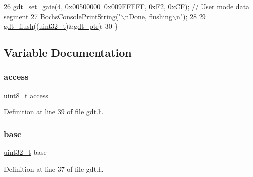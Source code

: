 \begin{DoxyCode}
26     \hyperlink{a00065_abcf0775ea602ace125ae809475b6d8bf_abcf0775ea602ace125ae809475b6d8bf}{gdt\_set\_gate}(4, 0x00500000, 0x009FFFFF, 0xF2, 0xCF); \textcolor{comment}{// User mode data segment}
27     \hyperlink{a00047_a19e1f554d03c977f8b947f21489daa41_a19e1f554d03c977f8b947f21489daa41}{BochsConsolePrintString}(\textcolor{stringliteral}{"\(\backslash\)nDone, flushing\(\backslash\)n"});
28 
29     \hyperlink{a00068_a62397fecbde23244b570ae632fe926fa_a62397fecbde23244b570ae632fe926fa}{gdt\_flush}((\hyperlink{a00101_a435d1572bf3f880d55459d9805097f62_a435d1572bf3f880d55459d9805097f62}{uint32\_t})&\hyperlink{a00068_ab0888c07dfb9352ef76d05e63464cf0b_ab0888c07dfb9352ef76d05e63464cf0b}{gdt\_ptr});
30 \}
\end{DoxyCode}


\subsection{Variable Documentation}
\mbox{\label{a00068_a8b0d6200bc639dd37ff68847a0adde5f_a8b0d6200bc639dd37ff68847a0adde5f}} 
\subsubsection{\texorpdfstring{access}{access}}
{\footnotesize\ttfamily \hyperlink{a00101_aba7bc1797add20fe3efdf37ced1182c5_aba7bc1797add20fe3efdf37ced1182c5}{uint8\+\_\+t} access}



Definition at line 39 of file gdt.\+h.

\mbox{\label{a00068_a0523cedff47e2441fc198b7770ec5d3f_a0523cedff47e2441fc198b7770ec5d3f}} 
\subsubsection{\texorpdfstring{base}{base}}
{\footnotesize\ttfamily \hyperlink{a00101_a435d1572bf3f880d55459d9805097f62_a435d1572bf3f880d55459d9805097f62}{uint32\+\_\+t} base}



Definition at line 37 of file gdt.\+h.

\mbox{\label{a00068_a1a173457c7aa39c59c008fcc3332d2b3_a1a173457c7aa39c59c008fcc3332d2b3}} 

